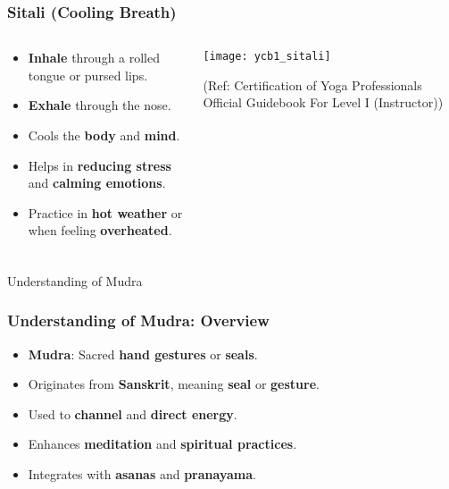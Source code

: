 \begin{frame}[fragile]\frametitle{Sitali (Cooling Breath)}
\begin{columns}
    \begin{column}[T]{0.5\linewidth}
      \begin{itemize}
        \item \textbf{Inhale} through a rolled tongue or pursed lips.
        \item \textbf{Exhale} through the nose.
        \item Cools the \textbf{body} and \textbf{mind}.
        \item Helps in \textbf{reducing stress} and \textbf{calming emotions}.
        \item Practice in \textbf{hot weather} or when feeling \textbf{overheated}.
      \end{itemize}
    \end{column}
    \begin{column}[T]{0.5\linewidth}
        \begin{center}
        \texttt{[image: ycb1\_sitali]}
				
		{\tiny (Ref: Certification  of Yoga Professionals Official Guidebook For Level I (Instructor))}	 
        \end{center}	
    \end{column}
\end{columns}
\end{frame}


\begin{frame}[fragile]\frametitle{}
\begin{center}
{\Large Understanding of Mudra}
\end{center}
\end{frame}

\begin{frame}[fragile]\frametitle{Understanding of Mudra: Overview}

      \begin{itemize}
        \item \textbf{Mudra}: Sacred \textbf{hand gestures} or \textbf{seals}.
        \item Originates from \textbf{Sanskrit}, meaning \textbf{seal} or \textbf{gesture}.
        \item Used to \textbf{channel} and \textbf{direct energy}.
        \item Enhances \textbf{meditation} and \textbf{spiritual practices}.
        \item Integrates with \textbf{asanas} and \textbf{pranayama}.
      \end{itemize}
\end{frame}

